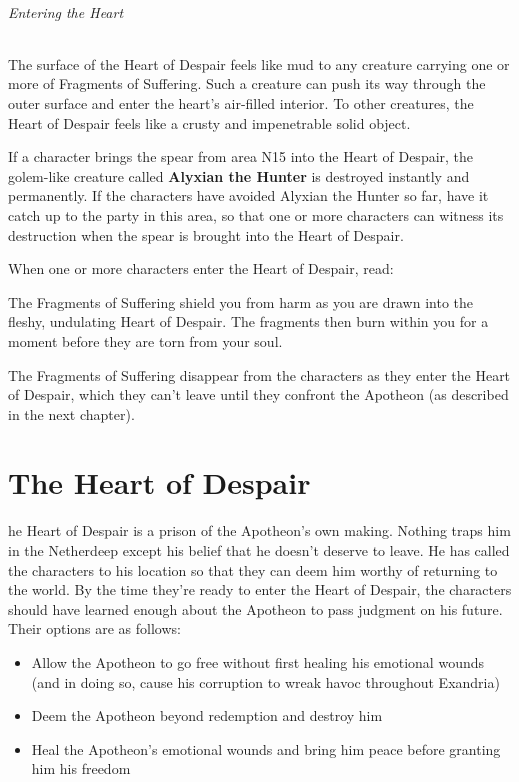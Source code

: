 \documentclass[10pt,a4paper,twoside,fancy,bg=print,twocolumn,openany,nodeprecatedcode]{dndbook}
\begin{document}
\subparagraph{Entering the Heart}
The surface of the Heart of Despair feels like mud to any creature carrying one or more of Fragments of Suffering. Such a creature can push its way through the outer surface and enter the heart's air-filled interior. To other creatures, the Heart of Despair feels like a crusty and impenetrable solid object.

If a character brings the spear from area N15 into the Heart of Despair, the golem-like creature called \textbf{Alyxian the Hunter} is destroyed instantly and permanently. If the characters have avoided Alyxian the Hunter so far, have it catch up to the party in this area, so that one or more characters can witness its destruction when the spear is brought into the Heart of Despair.

When one or more characters enter the Heart of Despair, read:

\begin{DndReadAloud}{}
The Fragments of Suffering shield you from harm as you are drawn into the fleshy, undulating Heart of Despair. The fragments then burn within you for a moment before they are torn from your soul.

\end{DndReadAloud}

The Fragments of Suffering disappear from the characters as they enter the Heart of Despair, which they can't leave until they confront the Apotheon (as described in the next chapter).

\chapter{The Heart of Despair}
he Heart of Despair is a prison of the Apotheon's own making. Nothing traps him in the Netherdeep except his belief that he doesn't deserve to leave. He has called the characters to his location so that they can deem him worthy of returning to the world. By the time they're ready to enter the Heart of Despair, the characters should have learned enough about the Apotheon to pass judgment on his future. Their options are as follows:



\begin{itemize}
\item Allow the Apotheon to go free without first healing his emotional wounds (and in doing so, cause his corruption to wreak havoc throughout Exandria)
\item Deem the Apotheon beyond redemption and destroy him
\item Heal the Apotheon's emotional wounds and bring him peace before granting him his freedom
\end{itemize}
\end{document}
